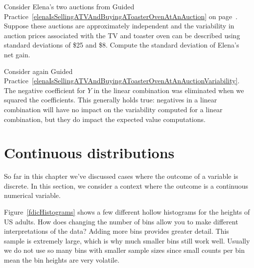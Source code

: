 \begin{exercisewrap}
\begin{nexercise}\label{elenaIsSellingATVAndBuyingAToasterOvenAtAnAuctionVariability}
Consider Elena's two auctions from Guided Practice~\ref{elenaIsSellingATVAndBuyingAToasterOvenAtAnAuction} on page~\pageref{elenaIsSellingATVAndBuyingAToasterOvenAtAnAuction}. Suppose these auctions are approximately independent and the variability in auction prices associated with the TV and toaster oven can be described using standard deviations of \$25 and \$8. Compute the standard deviation of Elena's net gain.\footnotemark
\end{nexercise}
\end{exercisewrap}

Consider again Guided Practice~\ref{elenaIsSellingATVAndBuyingAToasterOvenAtAnAuctionVariability}. The negative coefficient for $Y$ in the linear combination was eliminated when we squared the coefficients. This generally holds true: negatives in a linear combination will have no impact on the variability computed for a linear combination, but they do impact the expected value computations.



{}





\section{Continuous distributions}
\label{contDist}

\noindent%
So far in this chapter we've discussed cases
where the outcome of a variable is discrete.
In this section, we consider a context where
the outcome is a continuous numerical variable.

\begin{examplewrap}
\begin{nexample}{Figure~\ref{fdicHistograms} shows a few
    different hollow histograms for the heights of US adults.
    How does changing the number of bins allow you to make
    different interpretations of the data?}
  \label{usHeights}%
  Adding more bins provides greater detail.
  This sample is extremely large, which is why much smaller
  bins still work well.
  Usually we do not use so many bins with smaller sample
  sizes since small counts per bin mean the bin heights
  are very volatile.
\end{nexample}
\end{examplewrap}

